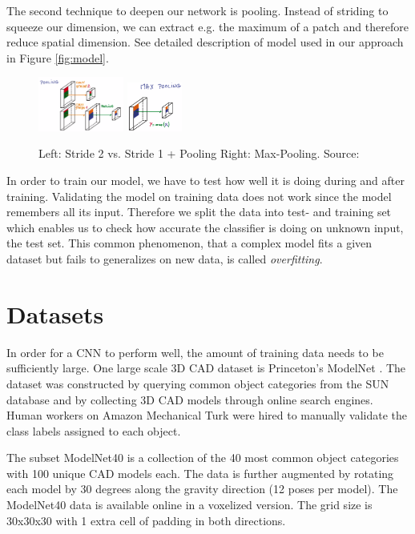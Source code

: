 \documentclass[10pt,twocolumn,letterpaper]{article}
\begin{document}
The second technique to deepen our network is pooling. Instead of striding to squeeze our dimension, we can extract e.g. the maximum of a patch and therefore reduce spatial dimension. 
See detailed description of model used in our approach in Figure \ref{fig:model}.

\begin{figure}[h]
	\label{fig:pooling}
	\includegraphics[width=0.25\textwidth]{figures/con_max}
	\includegraphics[width=0.16\textwidth]{figures/max}
	\caption{Left: Stride 2 vs. Stride 1 + Pooling \quad Right: Max-Pooling. Source: \cite{udacity}}
\end{figure}

In order to train our model, we have to test how well it is doing during and after training. 
Validating the model on training data does not work since the model remembers all its input. Therefore we split the data into test- and training set which enables us to check how accurate the classifier is doing on unknown input, the test set. This common phenomenon, that a complex model fits a given dataset but fails to generalizes on new data, is called \textit{overfitting}.

\section{Datasets}
\label{data:modelnet}

In order for a CNN to perform well, the amount of training data needs to be sufficiently large. One large scale 3D CAD dataset is Princeton's 
ModelNet \cite{shape}. The dataset was constructed by querying common object categories from the SUN database \cite{sun} and 
by collecting 3D CAD models through online search engines. Human workers on Amazon Mechanical Turk were hired 
to manually validate the class labels assigned to each object.

The subset ModelNet40 is a collection of the 40 most common object categories with 100 unique CAD models each. The data is further augmented
by rotating each model by 30 degrees along the gravity direction (12 poses per model). 
The ModelNet40 data is available online in a voxelized version.  The grid size is 30x30x30 with 1 extra cell of padding in both directions.
\end{document}
